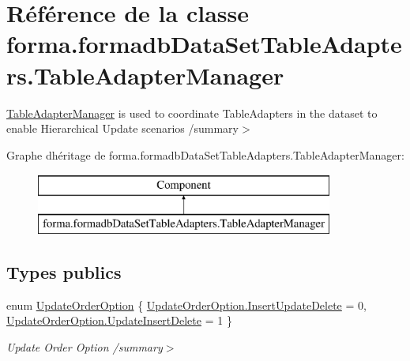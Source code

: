 \hypertarget{classforma_1_1formadb_data_set_table_adapters_1_1_table_adapter_manager}{}\section{Référence de la classe forma.\+formadb\+Data\+Set\+Table\+Adapters.\+Table\+Adapter\+Manager}
\label{classforma_1_1formadb_data_set_table_adapters_1_1_table_adapter_manager}


\hyperlink{classforma_1_1formadb_data_set_table_adapters_1_1_table_adapter_manager}{Table\+Adapter\+Manager} is used to coordinate Table\+Adapters in the dataset to enable Hierarchical Update scenarios /summary$>$  


Graphe d\textquotesingle{}héritage de forma.\+formadb\+Data\+Set\+Table\+Adapters.\+Table\+Adapter\+Manager\+:\begin{figure}[H]
\begin{center}
\leavevmode
\includegraphics[height=2.000000cm]{classforma_1_1formadb_data_set_table_adapters_1_1_table_adapter_manager}
\end{center}
\end{figure}
\subsection*{Types publics}
\begin{DoxyCompactItemize}
\item 
enum \hyperlink{classforma_1_1formadb_data_set_table_adapters_1_1_table_adapter_manager_aca02cb135cfe46391a8a8e751cfed92b}{Update\+Order\+Option} \{ \hyperlink{classforma_1_1formadb_data_set_table_adapters_1_1_table_adapter_manager_aca02cb135cfe46391a8a8e751cfed92ba27b77cb15d3da7ded0250d0001bc6755}{Update\+Order\+Option.\+Insert\+Update\+Delete} = 0, 
\hyperlink{classforma_1_1formadb_data_set_table_adapters_1_1_table_adapter_manager_aca02cb135cfe46391a8a8e751cfed92ba894fcc001e51f673d3fb5f3096473dd8}{Update\+Order\+Option.\+Update\+Insert\+Delete} = 1
 \}\begin{DoxyCompactList}\small\item\em Update Order Option /summary$>$ \end{DoxyCompactList}
\end{DoxyCompactItemize}

